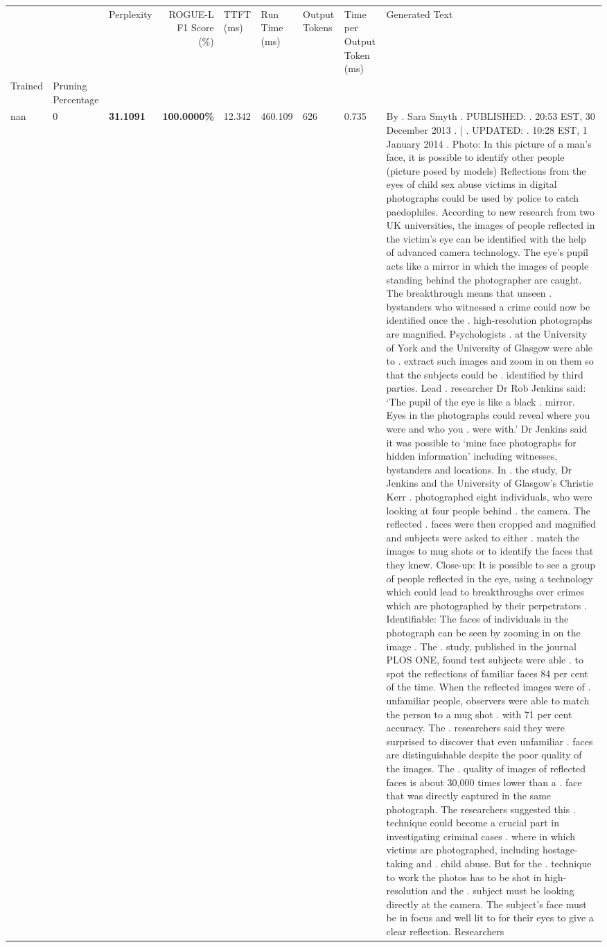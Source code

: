 \begin{table}[H]
\label{tab:evaluation-pipeline-5}
\begin{tabular}{lllrlllll}
\toprule
 &  & Perplexity & ROGUE-L F1 Score (\%) & TTFT (ms) & Run Time (ms) & Output Tokens & Time per Output Token (ms) & Generated Text \\
Trained & Pruning Percentage &  &  &  &  &  &  &  \\
\midrule
nan & 0 & \bfseries 31.1091 & \bfseries 100.0000\% & 12.342 & 460.109 & 626 & 0.735 & By . Sara Smyth . PUBLISHED: . 20:53 EST, 30 December 2013 . | . UPDATED: . 10:28 EST, 1 January 2014 . Photo: In this picture of a man's face, it is possible to identify other people (picture posed by models) Reflections from the eyes of child sex abuse victims in digital photographs could be used by police to catch paedophiles. According to new research from two UK universities, the images of people reflected in the victim's eye can be identified with the help of advanced camera technology. The eye's pupil acts like a mirror in which the images of people standing behind the photographer are caught. The breakthrough means that unseen . bystanders who witnessed a crime could now be identified once the . high-resolution photographs are magnified. Psychologists . at the University of York and the University of Glasgow were able to . extract such images and zoom in on them so that the subjects could be . identified by third parties. Lead . researcher Dr Rob Jenkins said: ‘The pupil of the eye is like a black . mirror. Eyes in the photographs could reveal where you were and who you . were with.' Dr Jenkins said it was possible to ‘mine face photographs for hidden information' including witnesses, bystanders and locations. In . the study, Dr Jenkins and the University of Glasgow's Christie Kerr . photographed eight individuals, who were looking at four people behind . the camera. The reflected . faces were then cropped and magnified and subjects were asked to either . match the images to mug shots or to identify the faces that they knew. Close-up: It is possible to see a group of people reflected in the eye, using a technology which could lead to breakthroughs over crimes which are photographed by their perpetrators . Identifiable: The faces of individuals in the photograph can be seen by zooming in on the image . The . study, published in the journal PLOS ONE, found test subjects were able . to spot the reflections of familiar faces 84 per cent of the time. When the reflected images were of . unfamiliar people, observers were able to match the person to a mug shot . with 71 per cent accuracy. The . researchers said they were surprised to discover that even unfamiliar . faces are distinguishable despite the poor quality of the images. The . quality of images of reflected faces is about 30,000 times lower than a . face that was directly captured in the same photograph. The researchers suggested this . technique could become a crucial part in investigating criminal cases . where in which victims are photographed, including hostage-taking and . child abuse. But for the . technique to work the photos has to be shot in high-resolution and the . subject must be looking directly at the camera. The subject's face must be in focus and well lit to for their eyes to give a clear reflection. Researchers 
\end{tabular}
\end{table}
